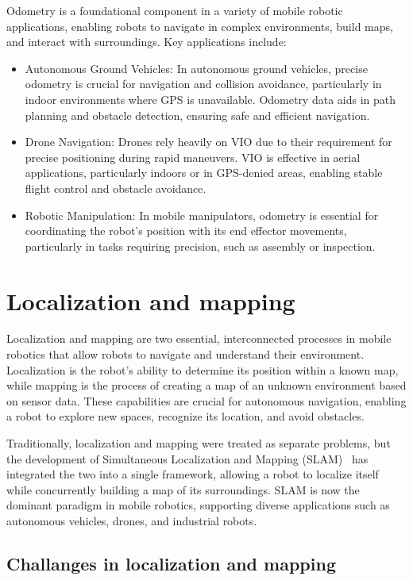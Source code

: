 Odometry is a foundational component in a variety of mobile robotic applications, enabling robots to navigate in complex environments, build maps, and interact with surroundings. Key applications include:
\begin{itemize}
    \item Autonomous Ground Vehicles: In autonomous ground vehicles, precise odometry is crucial for navigation and collision avoidance, particularly in indoor environments where GPS is unavailable. Odometry data aids in path planning and obstacle detection, ensuring safe and efficient navigation.
    \item Drone Navigation: Drones rely heavily on VIO due to their requirement for precise positioning during rapid maneuvers. VIO is effective in aerial applications, particularly indoors or in GPS-denied areas, enabling stable flight control and obstacle avoidance.
    \item Robotic Manipulation: In mobile manipulators, odometry is essential for coordinating the robot's position with its end effector movements, particularly in tasks requiring precision, such as assembly or inspection.
\end{itemize}

\section{Localization and mapping}

Localization and mapping are two essential, interconnected processes in mobile robotics that allow robots to navigate and understand their environment. Localization is the robot's ability to determine its position within a known map, while mapping is the process of creating a map of an unknown environment based on sensor data. These capabilities are crucial for autonomous navigation, enabling a robot to explore new spaces, recognize its location, and avoid obstacles.

Traditionally, localization and mapping were treated as separate problems, but the development of Simultaneous Localization and Mapping (SLAM)~\cite{slam} has integrated the two into a single framework, allowing a robot to localize itself while concurrently building a map of its surroundings. SLAM is now the dominant paradigm in mobile robotics, supporting diverse applications such as autonomous vehicles, drones, and industrial robots.

\subsection{Challanges in localization and mapping}

